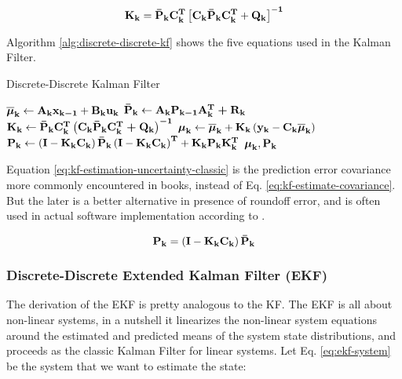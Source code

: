 \documentclass[12pt]{article}
\begin{document}
\begin{equation}
    \boldsymbol{\mathbf{K_k}} = \boldsymbol{\mathbf{\bar{P}_k}}\boldsymbol{\mathbf{C_k^T}} \left[\boldsymbol{\mathbf{C_k}}\boldsymbol{\mathbf{\bar{P}_k}}\boldsymbol{\mathbf{C_k^T}} + \boldsymbol{\mathbf{Q_k}}\right]^\mathbf{-1}
    \label{eq:kf-gain}
\end{equation}

Algorithm \ref{alg:discrete-discrete-kf} shows the five equations used in the Kalman Filter.
\begin{algorithm}[h]
\caption{Discrete-Discrete Kalman Filter}
\label{alg:discrete-discrete-kf}
\begin{algorithmic}[1]
\State ${\boldsymbol{\overline{\mu}}}_\mathbf{k} \gets \boldsymbol{\mathbf{A_k}}\boldsymbol{\mathbf{x_{k-1}}} + \boldsymbol{\mathbf{B_k}}\boldsymbol{\mathbf{u_k}}$ 
\State $\boldsymbol{\mathbf{\bar{P}_k}} \gets \boldsymbol{\mathbf{A_k P_{k-1} A^T_k + R_k}}$ 
\State $\boldsymbol{\mathbf{K_k}} \gets \boldsymbol{\mathbf{\bar{P}_k C^T_k \left(C_k \bar{P}_k C^T_k + Q_k\right)^{-1}}}$ 
\State ${\boldsymbol{\mu}}_\mathbf{k} \gets {\boldsymbol{\overline{\mu}}}_\mathbf{k} + \boldsymbol{\mathbf{K_k}} \left(\boldsymbol{\mathbf{y_k}} - \boldsymbol{\mathbf{C_k}}{\boldsymbol{\overline{\mu}}}_\mathbf{k}\right)$ 
\State $\boldsymbol{\mathbf{P_k}} \gets \left(\boldsymbol{\mathbf{I}} - \boldsymbol{\mathbf{K_k C_k}}\right)\boldsymbol{\mathbf{\bar{P}_k}} \left(\boldsymbol{\mathbf{I}} - \boldsymbol{\mathbf{K_k C_k}}\right)^\mathbf{T} + \boldsymbol{\mathbf{K_k P_k K_k^T}}$ 
\State \Return ${\boldsymbol{\mu}}_\mathbf{k}, \boldsymbol{\mathbf{P_k}}$
\EndProcedure
\end{algorithmic}
\end{algorithm}

Equation \ref{eq:kf-estimation-uncertainty-classic} is the prediction error covariance more commonly encountered in books, instead of Eq. \ref{eq:kf-estimate-covariance}. But the later is a better alternative in presence of roundoff error, and is often used in actual software implementation according to \cite[p.~ 73]{lewis2017optimal}.

\begin{equation}
    \boldsymbol{\mathbf{P_k}} = \left(\boldsymbol{\mathbf{I}} - \boldsymbol{\mathbf{K_k C_k}}\right)\boldsymbol{\mathbf{\Bar{P}_k}}
    \label{eq:kf-estimation-uncertainty-classic}
\end{equation}

\subsubsection{Discrete-Discrete Extended Kalman Filter (EKF)}
The derivation of the EKF is pretty analogous to the KF. The EKF is all about 
non-linear systems, in a nutshell it linearizes the non-linear system equations 
around the estimated and predicted means of the system state distributions, and 
proceeds as the classic Kalman Filter for linear systems.
Let Eq. \ref{eq:ekf-system} be the system that we want to estimate the state:
\end{document}
